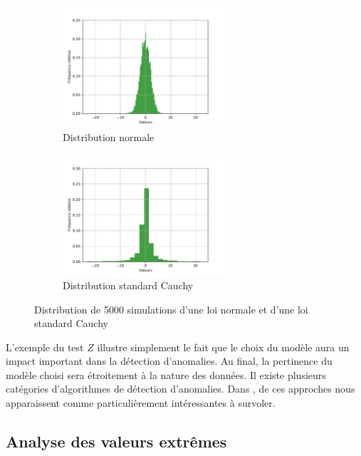 \begin{figure}[htb]
	\centering
	\begin{subfigure}{6cm}
		\centering\includegraphics[width=6cm]{images/histogram-normal-ztest}
		\caption{Distribution normale}
		\label{fig:Ztest_a}
	\end{subfigure}
	\begin{subfigure}{6cm}
		\centering\includegraphics[width=6cm]{images/histogram-cauchy-ztest}
		\caption{Distribution standard Cauchy}
		\label{fig:Ztest_b}
	\end{subfigure}
	\caption{Distribution de 5000 simulations d'une loi normale \DIFaddbeginFL {}\DIFaddendFL et d'une loi standard Cauchy \DIFaddbeginFL {}\DIFaddendFL }
	\label{fig:ZTest}
\end{figure}

L'exemple du test $Z$ illustre simplement le fait que le choix du modèle aura un impact important dans la détection d'anomalies. Au final, la pertinence du modèle choisi sera étroitement \DIFdelbegin {}\DIFdelend \DIFaddbegin {}\DIFaddend à la nature des données. Il existe plusieurs catégories d'algorithmes de détection d'anomalies. Dans \cite{10.5555/3086742}, \DIFdelbegin {}\DIFdelend \DIFaddbegin {}\DIFaddend de ces approches nous apparaissent comme particulièrement intéressantes à survoler.

\subsection{Analyse des valeurs extrêmes}

